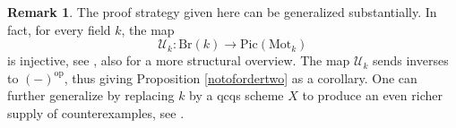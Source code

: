 \documentclass[10pt]{amsart}
\theoremstyle{definition}
\newtheorem{remark}[theorem]{Remark}
\newcommand{\op}{\mathrm{op}}
\newcommand{\Br}{\mathrm{Br}}
\begin{document}
\begin{remark}
The proof strategy given here can be generalized substantially. In fact, for every field $k$, the map
$$ \mathcal{U}_k : \Br(k) \rightarrow \mathrm{Pic}(\mathrm{Mot}_k)$$
is injective, see \cite[Theorem 9.1]{Tabuada2014Additive}, also \cite{Ramzi2025Localizing} for a more structural overview. The map $\mathcal{U}_k$ sends inverses to $(-)^{\op}$, thus giving Proposition \ref{notofordertwo} as a corollary. One can further generalize by replacing $k$ by a qcqs scheme $X$ to produce an even richer supply of counterexamples, see \cite[p.\ 3]{Ramzi2025Localizing}.
\end{remark}



\begingroup
\setlength{\emergencystretch}{8em}
\printbibliography
\endgroup
\end{document}
